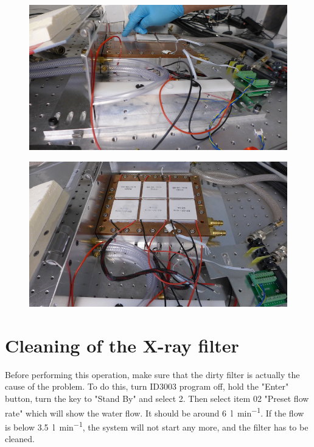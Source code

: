 \documentclass[a4paper,12pt,twoside]{article}
\begin{document}
\begin{appendices}
\begin{figure} [h!]
\centering
\begin{minipage}{.48\textwidth}
  \centering
  \includegraphics[width=\textwidth]{./Point9a.png}
  \label{Step9a}
\end{minipage}%
\hspace{2mm}
\begin{minipage}{.48\textwidth}
  \centering
  \includegraphics[width=\textwidth]{./Point9b.png}
  \label{Step9b}
\end{minipage}
\end{figure}
\clearpage
\newpage
\section{Cleaning of the X-ray filter} \label{Filter}

Before performing this operation, make sure that the dirty filter is actually the cause of the problem. To do this, turn ID3003 program off, hold the "Enter" button, turn the key to "Stand By" and select 2. Then select item 02 "Preset flow rate" which will show the water flow. It should be around \SI{6}{\litre\per\minute}. If the flow is below \SI{3.5}{\litre\per\minute}, the system will not start any more, and the filter has to be cleaned.
\\


\end{appendices}
\end{document}
